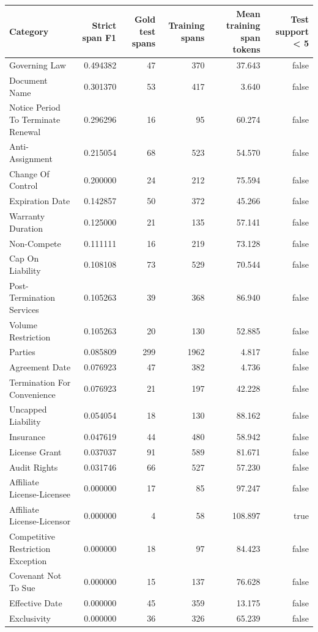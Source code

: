 \begin{tabular}{lrrrrr}
\toprule
Category & Strict span F1 & Gold test spans & Training spans & Mean training span tokens & Test support < 5 \\
\midrule
Governing Law & 0.494382 & 47 & 370 & 37.643 & false \\
Document Name & 0.301370 & 53 & 417 & 3.640 & false \\
Notice Period To Terminate Renewal & 0.296296 & 16 & 95 & 60.274 & false \\
Anti-Assignment & 0.215054 & 68 & 523 & 54.570 & false \\
Change Of Control & 0.200000 & 24 & 212 & 75.594 & false \\
Expiration Date & 0.142857 & 50 & 372 & 45.266 & false \\
Warranty Duration & 0.125000 & 21 & 135 & 57.141 & false \\
Non-Compete & 0.111111 & 16 & 219 & 73.128 & false \\
Cap On Liability & 0.108108 & 73 & 529 & 70.544 & false \\
Post-Termination Services & 0.105263 & 39 & 368 & 86.940 & false \\
Volume Restriction & 0.105263 & 20 & 130 & 52.885 & false \\
Parties & 0.085809 & 299 & 1962 & 4.817 & false \\
Agreement Date & 0.076923 & 47 & 382 & 4.736 & false \\
Termination For Convenience & 0.076923 & 21 & 197 & 42.228 & false \\
Uncapped Liability & 0.054054 & 18 & 130 & 88.162 & false \\
Insurance & 0.047619 & 44 & 480 & 58.942 & false \\
License Grant & 0.037037 & 91 & 589 & 81.671 & false \\
Audit Rights & 0.031746 & 66 & 527 & 57.230 & false \\
Affiliate License-Licensee & 0.000000 & 17 & 85 & 97.247 & false \\
Affiliate License-Licensor & 0.000000 & 4 & 58 & 108.897 & true \\
Competitive Restriction Exception & 0.000000 & 18 & 97 & 84.423 & false \\
Covenant Not To Sue & 0.000000 & 15 & 137 & 76.628 & false \\
Effective Date & 0.000000 & 45 & 359 & 13.175 & false \\
Exclusivity & 0.000000 & 36 & 326 & 65.239 & false \\

\end{tabular}
